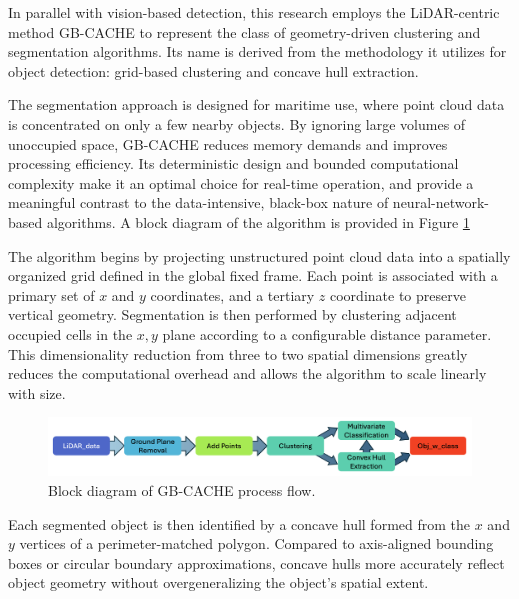 \documentclass[../main.tex]{subfiles}
\begin{document}

In parallel with vision-based detection, this research employs the LiDAR-centric method GB-CACHE to represent the class of geometry-driven clustering and segmentation algorithms.
Its name is derived from the methodology it utilizes for object detection: grid-based clustering and concave hull extraction.

The segmentation approach is designed for maritime use, where point cloud data is concentrated on only a few nearby objects.
By ignoring large volumes of unoccupied space, GB-CACHE reduces memory demands and improves processing efficiency.
Its deterministic design and bounded computational complexity make it an optimal choice for real-time operation, and provide a meaningful contrast to the data-intensive, black-box nature of neural-network-based algorithms.
A block diagram of the algorithm is provided in Figure \ref{fig:gbcache_flow}

The algorithm begins by projecting unstructured point cloud data into a spatially organized grid defined in the global fixed frame.
Each point is associated with a primary set of $x$ and $y$ coordinates, and a tertiary $z$ coordinate to preserve vertical geometry.
Segmentation is then performed by clustering adjacent occupied cells in the $x,y$ plane according to a configurable distance parameter.
This dimensionality reduction from three to two spatial dimensions greatly reduces the computational overhead and allows the algorithm to scale linearly with size.

\begin{figure}
    \centering
    \includegraphics[width=0.95\linewidth]{Images/gbcache/gbcache_flow.png}
    \caption{Block diagram of GB-CACHE process flow.}
    \label{fig:gbcache_flow}
\end{figure}

Each segmented object is then identified by a concave hull formed from the $x$ and $y$ vertices of a perimeter-matched polygon.
Compared to axis-aligned bounding boxes or circular boundary approximations, concave hulls more accurately reflect object geometry without overgeneralizing the object’s spatial extent.
\end{document}
